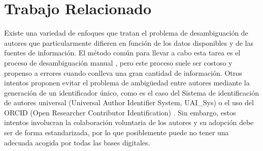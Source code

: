 \documentclass[conference]{IEEEtran}
\begin{document}
\section{Trabajo Relacionado}
Existe una variedad de enfoques que tratan el problema de desambiguación de autores que particularmente difieren en función de los datos disponibles y de las fuentes de información. El método común para llevar a cabo esta tarea es el proceso de desambiguación manual \cite{doi:10.1300/J115v22n04_01}, pero este proceso suele ser costoso y propenso a errores cuando conlleva una gran cantidad de información. Otros intentos proponen evitar el problema de ambigüedad entre autores  mediante la generación de un identificador único, como es el caso del Sistema de identificación de autores universal (Universal Author Identifier System, UAI\_Sys) \cite{Dervos2007TheUA} o el uso del ORCID (Open Researcher Contributor Identification) \cite{Haak2012ORCIDAS}. Sin embargo, estos intentos involucran la colaboración voluntaria  de los autores y su adopción debe ser de forma estandarizada, por lo que posiblemente puede no tener una adecuada acogida por todas las bases digitales. 
\end{document}

